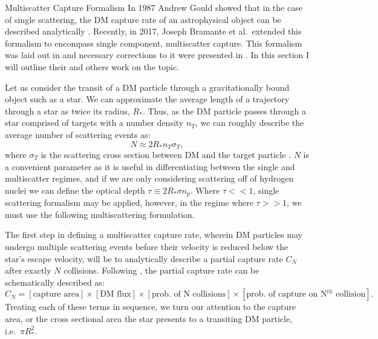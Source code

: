 \documentclass[a4paper,11pt]{article}
\begin{document}
\begin{section}{Multiscatter Capture Formalism}
    In 1987 Andrew Gould showed that in the case of single scattering, the DM capture rate of an astrophysical object can be described analytically \cite{Gould:1987}.
    Recently, in 2017, Joseph Bramante et al.~extended this formalism to encompass single component, multiscatter capture. 
    This formalism was laid out in \cite{Bramante:2017} and necessary corrections to it were presented in \cite{Ilie:2020Comment}.
    In this section I will outline their and others work on the topic.

    Let us consider the transit of a DM particle through a gravitationally bound object such as a star.
    We can approximate the average length of a trajectory through a star as twice its radius, $R_{*}$.
    Thus, as the DM particle passes through a star comprised of targets with a number density $n_T$, we can roughly describe the average number of scattering events as: 
    \begin{equation}
    N \approx 2 R_{*} n_T \sigma_T,
    \end{equation}
    where $\sigma_T$ is the scattering cross section between DM and the target particle \cite{Bramante:2017}.
    $N$ is a convenient parameter as it is useful in differentiating between the single and multiscatter regimes, and if we are only considering scattering off of hydrogen nuclei we can define the optical depth $\tau \equiv 2R_{*} \sigma n_p$.
    Where $\tau << 1$, single scattering formalism may be applied, however, in the regime where $\tau >> 1$, we must use the following multiscattering formulation.

    The first step in defining a multiscatter capture rate, wherein DM particles may undergo multiple scattering events before their velocity is reduced below the star's escape velocity, will be to analytically describe a partial capture rate $C_N$ after exactly $N$ collisions. Following \cite{Bramante:2017}, the partial capture rate can be schematically described as:
    $$ C_N = [\text{capture area}] \times [\text{DM flux}] \times [\text{prob. of N collisions}] \times [\text{prob. of capture on N$^{th}$ collision}]. $$
    Treating each of these terms in sequence, we turn our attention to the capture area, or the cross sectional area the star presents to a transiting DM particle, i.e.~$\pi R_*^2$.


\end{section}
\end{document}

